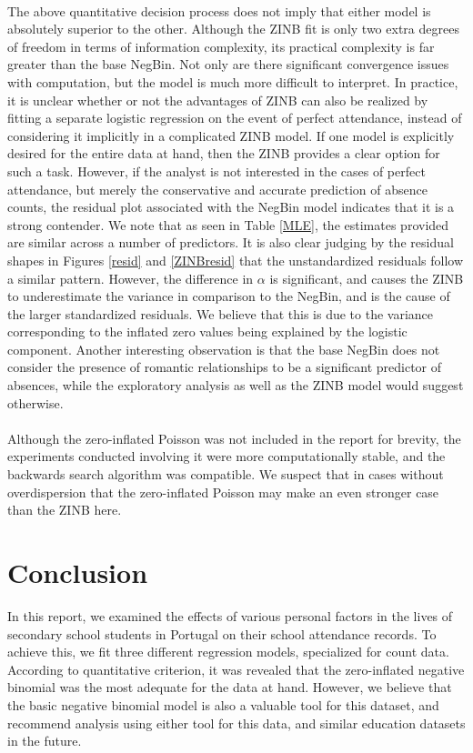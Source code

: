 \documentclass[12pt, titlepage]{article}
\begin{document}
	\paragraph{} The above quantitative decision process does not imply that either model is absolutely superior to the other. Although the ZINB fit is only two extra degrees of freedom in terms of information complexity, its practical complexity is far greater than the base NegBin. Not only are there significant convergence issues with computation, but the model is much more difficult to interpret. In practice, it is unclear whether or not the advantages of ZINB can also be realized by fitting a separate logistic regression on the event of perfect attendance, instead of considering it implicitly in a complicated ZINB model. If one model is explicitly desired for the entire data at hand, then the ZINB provides a clear option for such a task. However, if the analyst is not interested in the cases of perfect attendance, but merely the conservative and accurate prediction of absence counts, the residual plot associated with the NegBin model indicates that it is a strong contender. We note that as seen in Table \ref{MLE}, the estimates provided are similar across a number of predictors. It is also clear judging by the residual shapes in Figures \ref{resid} and \ref{ZINBresid} that the unstandardized residuals follow a similar pattern.  However, the difference in $\alpha$ is significant, and causes the ZINB to underestimate the variance in comparison to the NegBin, and is the cause of the larger standardized residuals. We believe that this is due to the variance corresponding to the inflated zero values being explained by the logistic component. Another interesting observation is that the base NegBin does not consider the presence of romantic relationships to be a significant predictor of absences, while the exploratory analysis as well as the ZINB model would suggest otherwise.
	\paragraph{} Although the zero-inflated Poisson was not included in the report for brevity, the experiments conducted involving it were more computationally stable, and the backwards search algorithm was compatible. We suspect that in cases without overdispersion that the zero-inflated Poisson may make an even stronger case than the ZINB here. 
	
	\section{Conclusion}
	In this report, we examined the effects of various personal factors in the lives of secondary school students in Portugal on their school attendance records. To achieve this, we fit three different regression models, specialized for count data. According to quantitative criterion, it was revealed that the zero-inflated negative binomial was the most adequate for the data at hand. However, we believe that the basic negative binomial model is also a valuable tool for this dataset, and recommend analysis using either tool for this data, and similar education datasets in the future.
	
\end{document}
